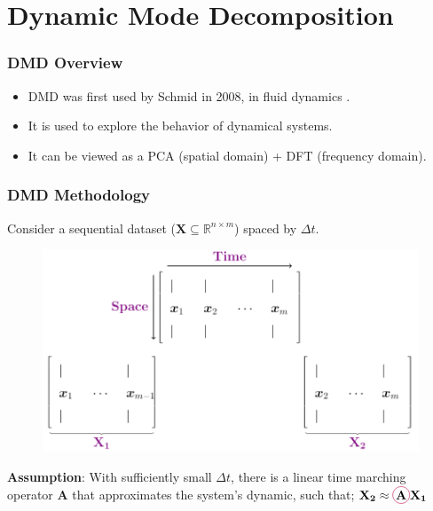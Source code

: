\documentclass[fleqn]{beamer}
\begin{document}
\section{Dynamic Mode Decomposition}
\begin{frame}
\frametitle{DMD Overview}
\begin {itemize}
\item DMD was first used by Schmid in 2008, in fluid dynamics \cite{schmid08}.
\item It is used to explore the behavior of dynamical systems.
\item  It can be viewed as a PCA (spatial domain) + DFT (frequency domain).

\end{itemize}
\end{frame}
\begin{frame}
\frametitle {DMD Methodology}
Consider a sequential dataset ($\mathbf{X} \subseteq \mathbb{R}^{n\times m}$) spaced by $\Delta t$.
     \begin{figure}[!htb]
     \centering
  \includegraphics[scale=0.29]{DATA.png}
  \label{fig:data_matrix}
\end{figure} 
\begin{block}{}
\small{\textbf{Assumption}: With sufficiently small $\Delta t$, there is a linear time marching operator $\mathbf{A}$ that approximates the system's dynamic, such that;} 
\centering
$
         \mathbf{X_2} \approx  \tikz[baseline]{\node[draw=purple,anchor=base,
circle,inner xsep=-2pt,inner ysep=3pt] {$\mathbf{A}$}} \mathbf{X_1}
$

\end{block}
\end{frame}
\end{document}
